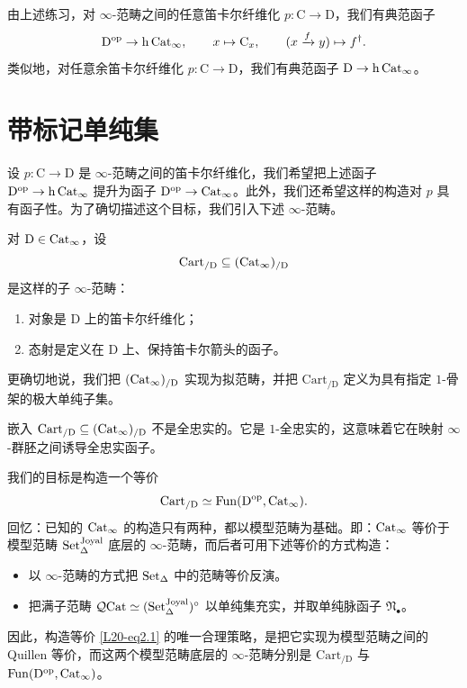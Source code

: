 \nitem\label{L20-1.9} 由上述练习，对 $\infty$-范畴之间的任意笛卡尔纤维化 $p\colon \mathrm{C}\to\mathrm{D}$，我们有典范函子
\[
\mathrm{D}^{\mathrm{op}}\to\mathrm{h}\operatorname{Cat}_\infty,\qquad x\mapsto\mathrm{C}_x,\qquad (x\xrightarrow{f}y)\mapsto f^{\dagger}.
\]
类似地，对任意余笛卡尔纤维化 $p\colon \mathrm{C}\to\mathrm{D}$，我们有典范函子 $\mathrm{D}\to\mathrm{h}\operatorname{Cat}_\infty$。

\section{带标记单纯集}

\nitem\label{L20-2.1} 设 $p\colon \mathrm{C}\to\mathrm{D}$ 是 $\infty$-范畴之间的笛卡尔纤维化，我们希望把上述函子 $\mathrm{D}^{\mathrm{op}}\to\mathrm{h}\operatorname{Cat}_\infty$ 提升为函子 $\mathrm{D}^{\mathrm{op}}\to\operatorname{Cat}_\infty$。此外，我们还希望这样的构造对 $p$ 具有函子性。为了确切描述这个目标，我们引入下述 $\infty$-范畴。

\begin{construction}\label{L20-2.2}
对 $\mathrm{D}\in\operatorname{Cat}_\infty$，设
\[
\mathrm{Cart}_{/\mathrm{D}}\subseteq(\operatorname{Cat}_\infty)_{/\mathrm{D}}
\]
是这样的子 $\infty$-范畴：
\begin{enumerate}[label=(\roman*),leftmargin=2.4em,itemsep=0.1em]
\item 对象是 $\mathrm{D}$ 上的笛卡尔纤维化；
\item 态射是定义在 $\mathrm{D}$ 上、保持笛卡尔箭头的函子。
\end{enumerate}
\end{construction}

\begin{remark}\label{L20-2.3}
更确切地说，我们把 $(\operatorname{Cat}_\infty)_{/\mathrm{D}}$ 实现为拟范畴，并把 $\mathrm{Cart}_{/\mathrm{D}}$ 定义为具有指定 $1$-骨架的极大单纯子集。
\end{remark}

\begin{warning}\label{L20-2.4}
嵌入 $\mathrm{Cart}_{/\mathrm{D}}\subseteq(\operatorname{Cat}_\infty)_{/\mathrm{D}}$ 不是全忠实的。它是 $1$-全忠实的，这意味着它在映射 $\infty$-群胚之间诱导全忠实函子。
\end{warning}

\nitem\label{L20-2.5} 我们的目标是构造一个等价
\begin{equation}\label{L20-eq2.1}
\mathrm{Cart}_{/\mathrm{D}}\simeq\operatorname{Fun}(\mathrm{D}^{\mathrm{op}},\operatorname{Cat}_\infty).
\end{equation}
回忆：已知的 $\operatorname{Cat}_\infty$ 的构造只有两种，都以模型范畴为基础。即：$\operatorname{Cat}_\infty$ 等价于模型范畴 $\operatorname{Set}^{\mathrm{Joyal}}_\Delta$ 底层的 $\infty$-范畴，而后者可用下述等价的方式构造：
\begin{itemize}[leftmargin=2.2em,itemsep=0.1em]
\item 以 $\infty$-范畴的方式把 $\operatorname{Set}_\Delta$ 中的范畴等价反演。
\item 把满子范畴 $\mathcal{Q}\mathrm{Cat}\simeq(\operatorname{Set}^{\mathrm{Joyal}}_\Delta)^\circ$ 以单纯集充实，并取单纯脉函子 $\mathfrak{N}_\bullet$。
\end{itemize}
因此，构造等价 \eqref{L20-eq2.1} 的唯一合理策略，是把它实现为模型范畴之间的 Quillen 等价，而这两个模型范畴底层的 $\infty$-范畴分别是 $\mathrm{Cart}_{/\mathrm{D}}$ 与 $\operatorname{Fun}(\mathrm{D}^{\mathrm{op}},\operatorname{Cat}_\infty)$。

